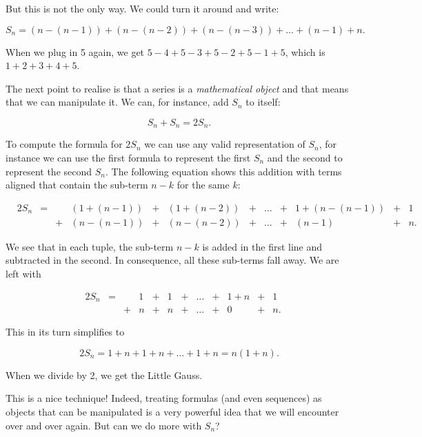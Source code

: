 \documentclass{scrreprt}
\begin{document}
But this is not the only way. We could turn it around
and write:

\begin{equation}
S_n = (n - (n-1)) + (n-(n-2)) + (n-(n-3)) + \dots + (n-1) + n.
\end{equation}

When we plug in 5 again, we get
$5 - 4 + 5 - 3 + 5 - 2 + 5 - 1 + 5$, which is
$1+2+3+4+5$.

The next point to realise is that a series is a
\emph{mathematical object} and that means that we can
manipulate it. We can, for instance, add $S_n$ to itself:

\[
S_n + S_n = 2S_n.
\]

To compute the formula for $2S_n$ we can use
any valid representation of $S_n$, for instance
we can use the first formula to represent the first $S_n$
and the second to represent the second $S_n$.
The following equation shows this addition with
terms aligned that contain the sub-term $n-k$ for the same $k$:

\begin{equation}
\begin{array}{lclclclccclcl}
&2S_n &=&   & (1 + (n-1)) & + & (1 + (n-2)) & + & \dots & + & 1 + (n-(n-1)) & + & 1 \\
&     & & + & (n - (n-1)) & + & (n-(n-2))   & + & \dots & + & (n-1) & + & n.
\end{array}
\end{equation}

We see that in each tuple, the sub-term $n-k$ is added in the first line
and subtracted in the second. In consequence,
all these sub-terms fall away. We are left with

\begin{equation}
\begin{array}{lclclclccclcl}
&2S_n &=&   & 1 & + & 1 & + & \dots & + & 1 + n & + & 1 \\
&     & & + & n & + & n & + & \dots & + & 0     & + & n.
\end{array}
\end{equation}

This in its turn simplifies to

\begin{equation}
2S_n = 1 + n + 1 + n + \dots + 1 + n =
n(1 + n).
\end{equation}

When we divide by 2, we get the Little Gauss.

This is a nice technique! Indeed, treating formulas (and even sequences)
as objects that can be manipulated is a very powerful idea that we will
encounter over and over again. But can we do more with $S_n$?
\end{document}
